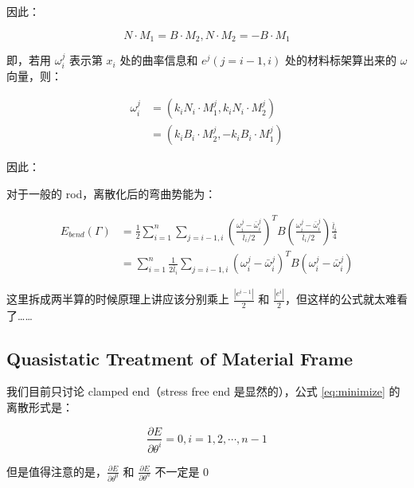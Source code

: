 \documentclass{notes}
\begin{document}
因此：

$$N \cdot M_1 = B \cdot M_2, N \cdot M_2 = -B \cdot M_1$$

即，若用 $\omega_i^j$ 表示第 $x_i$ 处的曲率信息和 $e^j(j = i - 1, i)$ 处的材料标架算出来的 $\omega$ 向量，则：

\begin{equation}
	\begin{aligned}
		\omega_i^j &= (k_iN_i \cdot M_1^j, k_iN_i \cdot M_2^j) \\
		&= (k_iB_i \cdot M_2^j, - k_iB_i \cdot M_1^j)
	\end{aligned}
\end{equation}

因此：

\begin{definition}
	对于一般的 rod，离散化后的弯曲势能为：

	\begin{equation}
		\begin{aligned}
			E_{bend}(\Gamma) &= \frac{1}{2} \sum\limits_{i = 1}^{n} \sum\limits_{j = i - 1, i}\left(\frac{\omega_i^j - \bar{\omega}_i^j}{\bar{l}_i / 2} \right)^T B \left(\frac{\omega_i^j - \bar{\omega}_i^j}{\bar{l}_i / 2} \right) \frac{\bar{l}_i}{4} \\
			&= \sum\limits_{i = 1}^{n} \frac{1}{2 \bar{l}_i} \sum\limits_{j = i - 1, i} (\omega_i^j - \bar{\omega}_i^j)^T B (\omega_i^j - \bar{\omega}_i^j)
		\end{aligned}
	\end{equation}
\end{definition}

\begin{remark}
	这里拆成两半算的时候原理上讲应该分别乘上 $\frac{\left|e^{i - 1}\right|}{2}$ 和 $\frac{\left|e^i\right|}{2}$，但这样的公式就太难看了……
\end{remark}

\subsection{Quasistatic Treatment of Material Frame}

我们目前只讨论 clamped end（stress free end 是显然的），公式 \ref{eq:minimize} 的离散形式是：

\begin{equation}\label{eq:disminimize}
	\frac{\partial E}{\partial \theta^i} = 0, i = 1, 2, \cdots, n - 1
\end{equation}

\begin{remark}
	但是值得注意的是，$\frac{\partial E}{\partial \theta^0}$ 和 $\frac{\partial E}{\partial \theta^n}$ 不一定是 $0$
\end{remark}
\end{document}
